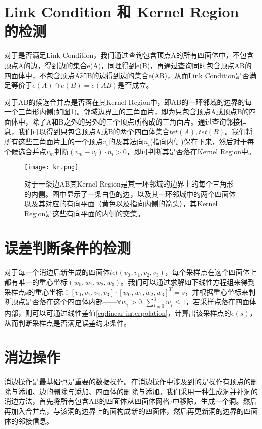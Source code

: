 \section{Link Condition 和 Kernel Region 的检测}
对于是否满足Link Condition，我们通过查询包含顶点A的所有四面体中，不包含顶点A的边，得到边的集合e(A)，同理得到e(B)，再通过查询同时包含顶点AB的四面体中，不包含顶点A和B的边得到边的集合e(AB)，从而Link Condition是否满足等价于$e(A) \cap e(B) = e(AB)$是否成立。 \par
对于AB的候选合并点是否落在其Kernel Region中，即AB的一环邻域的边界的每一个三角形内侧(如图\ref{fig:kr})。邻域边界上的三角面片，即为只包含顶点A或顶点B的四面体中，除了A和B之外的另外的三个顶点所构成的三角面片。通过查询邻接信息，我们可以得到只包含顶点A或B的两个四面体集合$tet(A),tet(B)$。我们将所有这些三角面片上的一个顶点$v_i$的及其法向$n_i$(指向内侧)保存下来，然后对于每个候选合并点$v_m$判断$(v_m − v_i) \cdot n_i > 0$，即可判断其是否落在Kernel Region中。
\begin{figure}[htbp]
    \centering
    \texttt{[image: kr.png]}
    \caption[3D Kernel Region]{对于一条边AB其Kernel Region是其一环邻域的边界上的每个三角形的内侧。图中显示了一条白色的边，以及其一环邻域中的两个四面体以及其对应的有向平面（黄色以及指向内侧的箭头），其Kernel Region是这些有向平面的内侧的交集。}
    \label{fig:kr}
\end{figure}

\section{误差判断条件的检测}
对于每一个消边后新生成的四面体$tet(v_0, v_1, v_2, v_3)$，每个采样点在这个四面体上都有唯一的重心坐标$(w_0, w_1, w_2, w_3)$。我们可以通过求解如下线性方程组来得到采样点s的重心坐标：$[v_0, v_1, v_2, v_3] \cdot [w_0, w_1, w_2, w_3]^T=s$，并根据重心坐标来判断顶点是否落在这个四面体内部——$\forall w_i>0, \sum_{i=0}^3 w_i \leq 1$，若采样点落在四面体内部，则可以可通过线性差值\eqref{eq:linear-interpolation}，计算出该采样点的$\epsilon(s)$，从而判断采样点是否满足误差约束条件。

\section{消边操作}
消边操作是最基础也是重要的数据操作。在消边操作中涉及到的是操作有顶点的删除与添加、边的删除与添加、四面体的删除与添加。我们采用一种生成洞并补洞的消边方法，首先将所有包含AB的四面体从四面体网格$\tau$中移除，生成一个洞。然后再加入合并点，与该洞的边界上的面构成新的四面体，然后再更新洞的边界的四面体的邻接信息。
